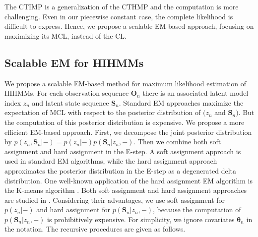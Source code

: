 \documentclass{article}
\begin{document}
The CTIMP is a generalization of the CTHMP and the computation is more challenging. Even in our piecewise constant case, the complete likelihood is difficult to express. Hence, we propose a scalable EM-based approach, focusing on maximizing its MCL, instead of the CL.


\subsection{Scalable EM for HIHMMs}
We propose a scalable EM-based method for maximum likelihood estimation of HIHMMs. For each observation sequence $\bm O_n$ there is an associated latent model index $z_n$ and latent state sequence $\bm S_n$. Standard EM approaches maximize the expectation of MCL with respect to the posterior distribution of $(z_n$ and $\bm S_n)$. But the computation of this posterior distribution is expensive. We propose a more efficient EM-based approach. First, we decompose the joint posterior distribution by $p(z_n, \bm S_n| -) = p(z_n| - )p(\bm S_n| z_n, -)$. Then we combine both soft assignment and hard assignment in the E-step. A soft assignment approach is used in standard EM algorithms, while the hard assignment approach approximates the posterior distribution in the E-step as a degenerated delta distribution. One well-known application of the hard assignment EM algorithm is the K-means algorithm \cite{Kanungo_2002}. Both soft assignment and hard assignment approaches are studied in \cite{Kearns_2013}.
Considering their advantages, we use soft assignment for $p(z_n| -)$ and hard assignment for $p(\bm S_n| z_n, -)$, because the computation of $p(\bm S_n|z_n, -)$ is prohibitively expensive. For simplicity, we ignore covariates $\bm{\theta}_n$ in the notation. The recursive procedures are given as follows.
\end{document}
